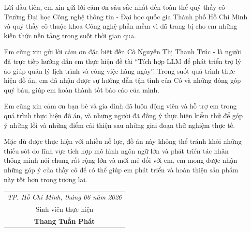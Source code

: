 \thispagestyle{empty}

Lời đầu tiên, em xin gửi lời cảm ơn sâu sắc nhất đến toàn thể quý thầy cô Trường Đại học Công nghệ thông tin - Đại học quốc gia Thành phố Hồ Chí Minh và quý thầy cô thuộc khoa Công nghệ phần mềm vì đã trang bị cho em những kiến thức nền tảng trong suốt thời gian qua.

Em cũng xin gửi lời cảm ơn đặc biệt đến Cô Nguyễn Thị Thanh Trúc - là người đã trực tiếp hướng dẫn em thực hiện đề tài “Tích hợp LLM để phát triển trợ lý ảo giúp quản lý lịch trình và công việc hàng ngày”. Trong suốt quá trình thực hiện đồ án, em đã nhận được sự hướng dẫn tận tình của Cô và những đóng góp quý báu, giúp em hoàn thành tốt báo cáo của mình.

Em cũng xin cảm ơn bạn bè và gia đình đã luôn động viên và hỗ trợ em trong quá trình thực hiện đồ án, và những người đã đồng ý thực hiện kiểm thử để góp ý những lỗi và những điểm cải thiện sau những giai đoạn thử nghiệm thực tế.

Mặc dù được thực hiện với nhiều nỗ lực, đồ án này không thể tránh khỏi những thiếu sót do lĩnh vực tích hợp mô hình ngôn ngữ lớn và phát triển tác nhân thông minh nói chung rất rộng lớn và mới mẻ đối với em, em mong được nhận những góp ý của thầy cô để có thể giúp em phát triển và hoàn thiện sản phẩm này tốt hơn trong tương lai.

\begin{flushright}
  \begin{tabular}{c}
    \it TP. Hồ Chí Minh, tháng 06 năm 2026 \\[0.3cm]
    Sinh viên thực hiện \\[0.6cm]
    \bfseries Thang Tuấn Phát
  \end{tabular}
\end{flushright}
